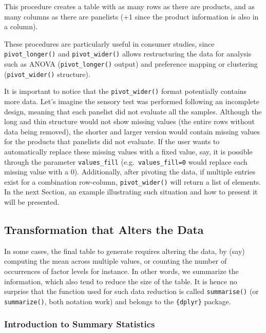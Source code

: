 \documentclass[
]{krantz}
\begin{document}
This procedure creates a table with as many rows as there are products, and as many columns as there are panelists (+1 since the product information is also in a column).

These procedures are particularly useful in consumer studies, since \texttt{pivot\_longer()} and \texttt{pivot\_wider()} allows restructuring the data for analysis such as ANOVA (\texttt{pivot\_longer()} output) and preference mapping or clustering (\texttt{pivot\_wider()} structure).

It is important to notice that the \texttt{pivot\_wider()} format potentially contains more data. Let's imagine the sensory test was performed following an incomplete design, meaning that each panelist did not evaluate all the samples. Although the long and thin structure would not show missing values (the entire rows without data being removed), the shorter and larger version would contain missing values for the products that panelists did not evaluate. If the user wants to automatically replace these missing values with a fixed value, say, it is possible through the parameter \texttt{values\_fill} (e.g.~\texttt{values\_fill=0} would replace each missing value with a 0). Additionally, after pivoting the data, if multiple entries exist for a combination row-column, \texttt{pivot\_wider()} will return a list of elements. In the next Section, an example illustrating such situation and how to present it will be presented.

\hypertarget{transformation-that-alters-the-data}{%
\subsection{Transformation that Alters the Data}\label{transformation-that-alters-the-data}}

In some cases, the final table to generate requires altering the data, by (say) computing the mean across multiple values, or counting the number of occurrences of factor levels for instance. In other words, we summarize the information, which also tend to reduce the size of the table. It is hence no surprise that the function used for such data reduction is called \texttt{summarise()} (or \texttt{summarize()}, both notation work) and belongs to the \texttt{\{dplyr\}} package.

\hypertarget{introduction-to-summary-statistics}{%
\subsubsection*{Introduction to Summary Statistics}\label{introduction-to-summary-statistics}}
\end{document}
